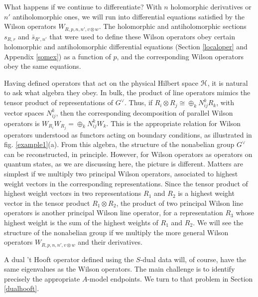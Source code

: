\documentclass[11pt,a4paper]{article}
\begin{document}
What happens if we continue to differentiate?
With $n$ holomorphic derivatives or $n'$ antiholomorphic ones, we will run into differential equations satisfied by the Wilson operators $W_{R,p,n,n',v\otimes w} $.
The holomorphic and antiholomorphic sections $ s_{R,r}$ and  $\bar s_{R',n'}$ that were used to define these Wilson operators
obey certain holomorphic and antiholomorphic 
differential equations (Section \ref{localoper} and Appendix \ref{somex}) as a function of $p$, and the corresponding Wilson operators obey the same equations.


Having defined operators that act on the physical Hilbert space ${\mathcal H}$, it is natural to ask what algebra they obey.   In bulk, the product of line operators
mimics the tensor product of representations of $G^\vee$.   Thus, if $R_i\otimes R_j\cong \oplus_k N^k_{ij}R_k$, with vector spaces $N^k_{ij}$, then
the corresponding decomposition of parallel Wilson operators is $W_{R_i} W_{R_j}=\oplus_k N^k_{ij} W_k$.     This is the appropriate relation for Wilson
operators understood as functors acting on boundary conditions, as illustrated in fig. \ref{example1}(a).   From this algebra, the structure of the nonabelian
group $G^\vee $ can be reconstructed, in principle.
However, for Wilson operators as operators on quantum states, as we are discussing here, the picture is different.
Matters are simplest if we multiply two principal Wilson operators, associated to highest weight vectors in the corresponding representations.
Since the tensor product of highest
weight vectors in two representations $R_1$ and $R_2$ is a highest weight vector in the tensor product $R_1\otimes R_2$,
the product of two principal Wilson line operators is another principal Wilson line operator, for a representation $R_3$ whose highest weight is the
sum of the highest weights of $R_1$ and $R_2$.   We will see the structure of the nonabelian group if we multiply the more general Wilson
operators $W_{R,p,n,n',v\otimes w}$ and their derivatives.

A dual 't Hooft operator  defined using the $S$-dual data will, of course, have the same eigenvalues as the Wilson
operators. The main challenge is to identify precisely the appropriate $A$-model endpoints.  We turn to that problem in Section \ref{dualhooft}.
\end{document}
